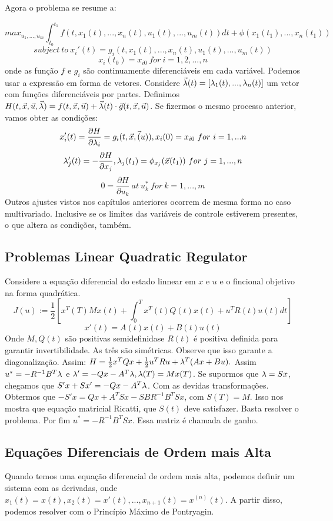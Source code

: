 Agora o problema se resume a:

$$
max_{u_1,...,u_m} \int_{t_0}^{t_1} f(t,x_1(t),...,x_n(t),u_1(t),...,u_m(t)) dt + \phi(x_1(t_1),...,x_n(t_1))
$$
$$
subject~to~x_i'(t) = g_i(t,x_1(t),...,x_n(t),u_1(t),...,u_m(t))
$$
$$
x_i(t_0) = x_{i0}~for~i=1,2,...,n
$$
onde as função $f$ e $g_i$ são continuamente diferenciáveis em cada variável. Podemos usar a expressão em forma de vetores. Considere $\Vec{\lambda}(t) = [\lambda_1(t),...,\lambda_n(t)]$ um vetor com funções diferenciáveis por partes. Definimos $H(t,\Vec{x},\Vec{u},\Vec{\lambda}) = f(t,\Vec{x},\Vec{u}) + \Vec{\lambda}(t)\cdot \Vec{g}(t,\Vec{x},\Vec{u})$. Se fizermos o mesmo processo anterior, vamos obter as condições:
$$
x'_i(t) = \frac{\partial H}{\partial \lambda_i} = g_i(t,\Vec{x},\Vec(u)), x_i(0) = x_{i0}~for~i = 1,...n 
$$
$$
\lambda'_j(t) = - \frac{\partial H}{\partial x_j}, \lambda_j(t_1) = \phi_{x_j}(\Vec{x}(t_1))~for~j=1,...,n
$$
$$
0 = \frac{\partial H}{\partial u_k}~at~u^*_k~for~k=1,...,m
$$
Outros ajustes vistos nos capítulos anteriores ocorrem de mesma forma no caso multivariado. Inclusive se os limites das variáveis de controle estiverem presentes, o que altera as condições, também. 

\subsection{Problemas Linear Quadratic Regulator}

Considere a equação diferencial do estado linnear em $x$ e $u$ e o fincional objetivo na forma quadrática. 
$$
J(u) := \frac{1}{2}[x^T(T)Mx(t) + \int_0^T x^T(t)Q(t)x(t) + u^TR(t)u(t) dt]
$$
$$
x'(t) = A(t)x(t) + B(t)u(t)
$$
Onde $M, Q(t)$ são positivas semidefinidase $R(t)$ é positiva definida para garantir invertibilidade. As três são simétricas. Observe que isso garante a diagonalização.
Assim: $H = \frac{1}{2}x^TQx + \frac{1}{2}u^TRu + \lambda^T(Ax + Bu).$ Assim $u^* = - R^{-1}B^T\lambda$ e $\lambda' = -Qx - A^T\lambda, \lambda(T) = Mx(T)$. Se supormos que $\lambda = Sx$, chegamos que $S'x + Sx' = -Qx - A^T\lambda$. Com as devidas transformações. Obtermos que $-S'x = Qx + A^TSx - SBR^{-1}B^TSx$, com $S(T) = M$. Isso nos mostra que equação matricial Ricatti, que $S(t)$ deve satisfazer. Basta resolver o problema. Por fim $u^* = -R^{-1}B^TSx$. Essa matriz é chamada de ganho. 

\subsection{Equações Diferenciais de Ordem mais Alta}
Quando temos uma equação diferencial de ordem mais alta, podemos definir um sistema com as derivadas, onde $x_1(t) = x(t), x_2(t) = x'(t), ..., x_{n+1}(t) = x^{(n)}(t)$. A partir disso, podemos resolver com o Princípio Máximo de Pontryagin. 

